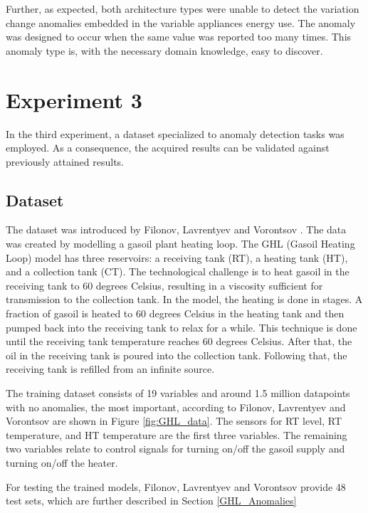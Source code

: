 Further, as expected, both architecture types were unable to detect the variation change anomalies embedded in the variable appliances energy use. The anomaly was designed to occur when the same value was reported too many times. This anomaly type is, with the necessary domain knowledge, easy to discover.

\section{Experiment 3}
In the third experiment, a dataset specialized to anomaly detection tasks was employed. As a consequence, the acquired results can be validated against previously attained results. 

\subsection{Dataset} \label{GHL_Dataset}
The dataset was introduced by Filonov, Lavrentyev and Vorontsov \parencite*{Filonov2016}. The data was created by modelling a gasoil plant heating loop. The GHL (Gasoil Heating Loop) model has three reservoirs: a receiving tank (RT), a heating tank (HT), and a collection tank (CT). The technological challenge is to heat gasoil in the receiving tank to 60 degrees Celsius, resulting in a viscosity sufficient for transmission to the collection tank. In the model, the heating is done in stages. A fraction of gasoil is heated to 60 degrees Celsius in the heating tank and then pumped back into the receiving tank to relax for a while. This technique is done until the receiving tank temperature reaches 60 degrees Celsius. After that, the oil in the receiving tank is poured into the collection tank. Following that, the receiving tank is refilled from an infinite source.

The training dataset consists of 19 variables and around 1.5 million datapoints with no anomalies, the most important, according to Filonov, Lavrentyev and Vorontsov \parencite{Filonov2016} are shown in Figure \ref{fig:GHL_data}. The sensors for RT level, RT temperature, and HT temperature are the first three variables. The remaining two variables relate to control signals for turning on/off the gasoil supply and turning on/off the heater.

For testing the trained models, Filonov, Lavrentyev and Vorontsov \parencite*{Filonov2016} provide 48 test sets, which are further described in Section \ref{GHL_Anomalies}

